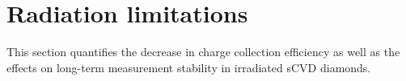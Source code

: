 





\clearpage
\section{Radiation limitations}
\label{sec:radlimit}
This section quantifies the decrease in charge collection efficiency as well as the effects on long-term measurement stability in irradiated sCVD diamonds.


